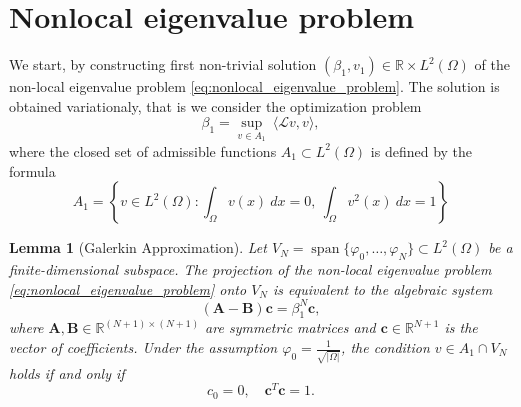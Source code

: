 \documentclass[11pt, a4paper]{article}
\theoremstyle{break}
\theoremstyle{break}
\theoremstyle{break}
\theoremstyle{break}
\theoremstyle{break}
\newtheorem{lem}{Lemma}[section]
\theoremstyle{break}
\theoremstyle{break}
\theoremstyle{break}
\theoremstyle{break}
\begin{document}
\section{Nonlocal eigenvalue problem}

We start, by constructing first non-trivial solution $(\beta_1, v_1) \in \mathbb{R} \times L^2(\Omega)$ of the non-local eigenvalue problem \eqref{eq:nonlocal_eigenvalue_problem}. The solution is obtained variationaly, that is we consider the optimization problem
\begin{equation}
    \label{eq:eigenvalue_problem_1}
    \beta_1 = \sup_{v \in A_1} \: \langle \mathcal L v, v \rangle,
\end{equation}
where the closed set of admissible functions $A_1 \subset L^2(\Omega)$ is defined by the formula
\begin{equation}
    \label{eq:A_set_Def}
    A_1 = \left\{ v \in L^2(\Omega) : \int_\Omega v(x) \:dx = 0, \: \int_\Omega v^2(x) \:dx = 1 \right\}
\end{equation}

\begin{lem}[Galerkin Approximation]
\label{lem:galerkin_approximation}
Let $V_N = \operatorname{span}\{\varphi_0, \dots, \varphi_N\} \subset L^2(\Omega)$ be a finite-dimensional subspace. The projection of the non-local eigenvalue problem \eqref{eq:nonlocal_eigenvalue_problem} onto $V_N$ is equivalent to the algebraic system 
\begin{equation}
    \label{eq:matrix_system_lemma}
    (\mathbf{A} - \mathbf{B})\mathbf{c} = \beta_1^N \mathbf{c},
\end{equation}
    where $\mathbf{A}, \mathbf{B} \in \mathbb{R}^{(N+1) \times (N+1)}$ are symmetric matrices and $\mathbf{c} \in \mathbb{R}^{N+1}$ is the vector of coefficients. Under the assumption $\varphi_0 = \frac{1}{\sqrt{|\Omega|}}$, the condition $v \in A_1 \cap V_N$ holds if and only if
    \begin{equation}
        \label{eq:system_constraint_lemma}
        c_0 = 0, \quad \mathbf{c}^T\mathbf{c} = 1.
    \end{equation}
\end{lem}
\end{document}
